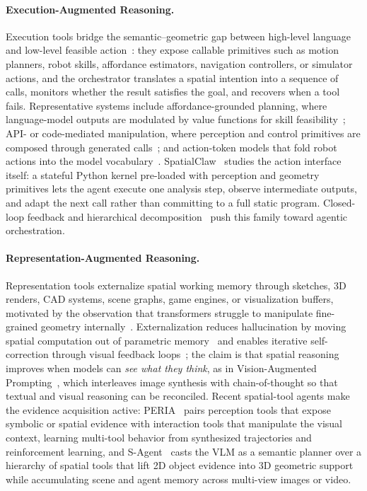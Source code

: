 \paragraph{Execution-Augmented Reasoning.}
Execution tools bridge the semantic--geometric gap between high-level language and low-level feasible action~\cite{zhang2025scaling}: they expose callable primitives such as motion planners, robot skills, affordance estimators, navigation controllers, or simulator actions, and the orchestrator translates a spatial intention into a sequence of calls, monitors whether the result satisfies the goal, and recovers when a tool fails.
Representative systems include affordance-grounded planning, where language-model outputs are modulated by value functions for skill feasibility~\cite{ahn2022icanisay}; API- or code-mediated manipulation, where perception and control primitives are composed through generated calls~\cite{liang2023code,huang2023voxposer}; and action-token models that fold robot actions into the model vocabulary~\cite{brohan2022rt,zitkovich2023rt2,driess2023palm}.
SpatialClaw~\cite{cho2026spatialclaw} studies the action interface itself: a stateful Python kernel pre-loaded with perception and geometry primitives lets the agent execute one analysis step, observe intermediate outputs, and adapt the next call rather than committing to a full static program.
Closed-loop feedback and hierarchical decomposition~\cite{huang2022innermonologue,singh2023progprompt,yang2024vlmtamp,chen2024autotamp,bhat2024brainbodyllm} push this family toward agentic orchestration.

\paragraph{Representation-Augmented Reasoning.}
Representation tools externalize spatial working memory through sketches, 3D renders, CAD systems, scene graphs, game engines, or visualization buffers, motivated by the observation that transformers struggle to manipulate fine-grained geometry internally~\cite{hu2024visualsketchpad}.
Externalization reduces hallucination by moving spatial computation out of parametric memory~\cite{hu2024visualsketchpad} and enables iterative self-correction through visual feedback loops~\cite{wu2025reinforcing}; the claim is that spatial reasoning improves when models can \textit{see what they think}, as in Vision-Augmented Prompting~\cite{xiao2024enhancing}, which interleaves image synthesis with chain-of-thought so that textual and visual reasoning can be reconciled.
Recent spatial-tool agents make the evidence acquisition active: PERIA~\cite{li2026peria} pairs perception tools that expose symbolic or spatial evidence with interaction tools that manipulate the visual context, learning multi-tool behavior from synthesized trajectories and reinforcement learning, and S-Agent~\cite{dai2026sagent} casts the VLM as a semantic planner over a hierarchy of spatial tools that lift 2D object evidence into 3D geometric support while accumulating scene and agent memory across multi-view images or video.

